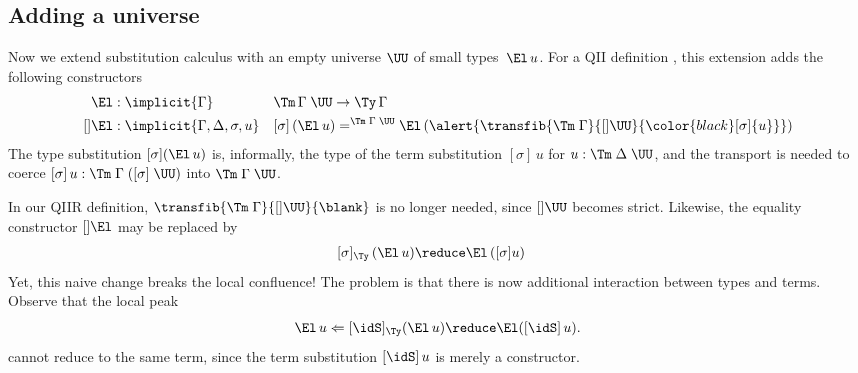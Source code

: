 \documentclass[a4paper,UKenglish,numberwithinsect,cleveref,thm-restate]{lipics-v2021}
\begin{document}
\subsection{Adding a universe} \label{subsec:SC+U}
Now we extend substitution calculus with an empty universe $\UU$ of small types~$\El\,u$.
For a QII definition \cite{Altenkirch2016a}, this extension adds the following constructors
\begin{alignat*}{3}
  \El   & : \implicit{\Gamma} && \Tm\,\Gamma\;\UU \to \Ty\,\Gamma \\
  []\El & : \implicit{\Gamma, \Delta, \sigma, u} && [ \sigma ]\,(\El\, u) =^{\Tm\;\Gamma\;\UU} \El\,(\alert{\transfib{\Tm\;\Gamma}{[]\UU}{\color{black}[\sigma]{u}}})
\end{alignat*}
The type substitution $[\sigma](\El\,u)$ is, informally, the type of the term substitution $[\sigma]\,u$ for $u : \Tm\;\Delta\;\UU$, and the transport is needed to coerce $[\sigma]\,u : \Tm\;\Gamma\;([\sigma]\;\UU)$ into $\Tm\;\Gamma\;\UU$.

In our QIIR definition, $\transfib{\Tm\;\Gamma}{[]\UU}{\blank}$ is no longer needed, since $[]\UU$ becomes strict. 
Likewise, the equality constructor $[]\El$ may be replaced by 
\begin{alignat*}{3}
  [ \sigma ]_{\Ty}\,(\El\, u) & \reduce \El\,([\sigma] {u})
\end{alignat*}
Yet, this naive change breaks the local confluence!
The problem is that there is now additional interaction between types and terms. Observe that the local peak
\[
  \El\,u \Leftarrow [\idS]_{\Ty}(\El\,u) \reduce \El([\idS]\,u).
\]
cannot reduce to the same term, since the term substitution $[\idS]\,u$ is merely a constructor.
\end{document}
